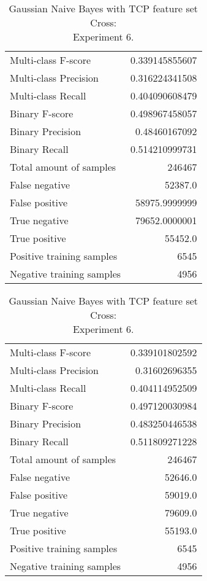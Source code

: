 \begin{table}[H]
\begin{minipage}{0.5\textwidth}
\caption{Gaussian Naive Bayes with TCP feature set Cross: \\Experiment 5.}
\centering
\begin{tabular}{l r}
\toprule
Multi-class F-score & 0.339145855607 \\
Multi-class Precision & 0.316224341508 \\
Multi-class Recall & 0.404090608479 \\
\midrule
Binary F-score & 0.498967458057 \\
Binary Precision & 0.48460167092 \\
Binary Recall & 0.514210999731 \\
\midrule
Total amount of samples & 246467 \\
False negative & 52387.0 \\
False positive & 58975.9999999 \\
True negative & 79652.0000001 \\
True positive & 55452.0 \\
\midrule
Positive training samples & 6545 \\
Negative training samples & 4956 \\
\bottomrule
\end{tabular}
\end{minipage}
\hfillx
\begin{minipage}{0.5\textwidth}
\caption{Gaussian Naive Bayes with TCP feature set Cross: \\Experiment 6.}
\centering
\begin{tabular}{l r}
\toprule
Multi-class F-score & 0.339101802592 \\
Multi-class Precision & 0.31602696355 \\
Multi-class Recall & 0.404114952509 \\
\midrule
Binary F-score & 0.497120030984 \\
Binary Precision & 0.483250446538 \\
Binary Recall & 0.511809271228 \\
\midrule
Total amount of samples & 246467 \\
False negative & 52646.0 \\
False positive & 59019.0 \\
True negative & 79609.0 \\
True positive & 55193.0 \\
\midrule
Positive training samples & 6545 \\
Negative training samples & 4956 \\
\bottomrule
\end{tabular}
\end{minipage}
\end{table}
